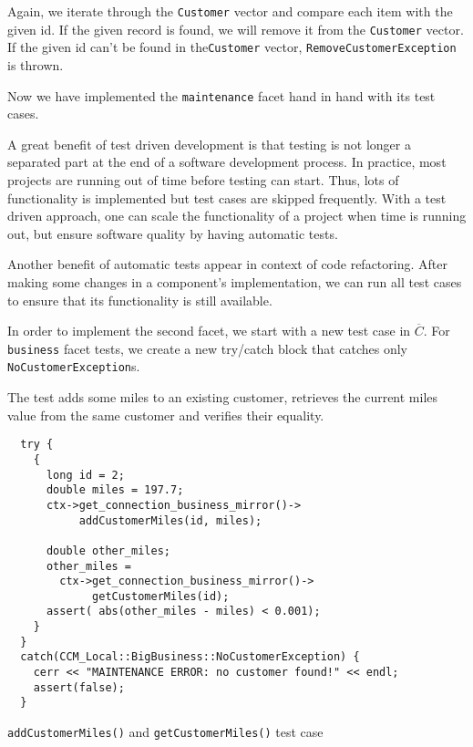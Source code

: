 Again, we iterate through the {\tt Customer} vector and compare each item with the given id.
If the given record is found, we will remove it from the {\tt Customer} vector.
If the given id can't be found in the{\tt Customer} vector, {\tt RemoveCustomerException}
is thrown.

Now we have implemented the {\tt maintenance} facet hand in hand with its test cases. 

A great benefit of test driven development is that testing is not longer a separated
part at the end of a software development process.
In practice, most projects are running out of time before testing can start. 
Thus, lots of functionality is implemented but test cases are skipped frequently.
With a test driven approach, one can scale the functionality of a project when time is
running out, but ensure software quality by having automatic tests.

Another benefit of automatic tests appear in context of code refactoring. 
After making some changes in a component's implementation, we can run all test cases 
to ensure that its functionality is still available.

\newpage

In order to implement the second facet, we start with a new test case in 
$\overline{C}$.
For {\tt business} facet tests, we create a new try/catch block that catches
only {\tt NoCustomerException}s.
 
The test adds some miles to an existing customer, retrieves the current miles value 
from the same customer and verifies their equality. 
\begin{Example}
\begin{minifbox}
\begin{small}
\begin{verbatim}
  try {
    {
      long id = 2;
      double miles = 197.7;
      ctx->get_connection_business_mirror()->
           addCustomerMiles(id, miles); 

      double other_miles;
      other_miles = 
        ctx->get_connection_business_mirror()->
             getCustomerMiles(id); 
      assert( abs(other_miles - miles) < 0.001);
    }
  }
  catch(CCM_Local::BigBusiness::NoCustomerException) {
    cerr << "MAINTENANCE ERROR: no customer found!" << endl;
    assert(false);
  }
\end{verbatim}
\end{small}
\end{minifbox}
\caption{{\tt addCustomerMiles()} and {\tt getCustomerMiles()} test case}
\label{example:}
\end{Example}


